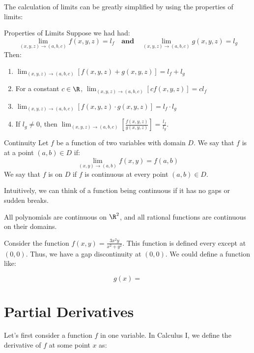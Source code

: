 The calculation of limits can be greatly simplified by using the properties of limits:
\begin{thmbox}{Properties of Limits}{}
    Suppose we had had:
    \[ \lim_{(x,y,z) \to (a,b,c)} f(x,y,z) = l_f \quad \textbf{and} \quad \lim_{(x,y,z) \to (a,b,c)} g(x,y,z) = l_g \]
    Then:
    \begin{enumerate}[noitemsep]
        \item $\lim_{(x,y,z) \to (a,b,c)} \left[ f(x,y,z) + g(x,y,z) \right] = l_f + l_g$
        \item For a constant $c \in \R$, $\lim_{(x,y,z) \to (a,b,c)} \left[ cf(x,y,z) \right] = cl_f$
        \item $\lim_{(x,y,z) \to (a,b,c)} \left[ f(x,y,z) \cdot g(x,y,z) \right] = l_f \cdot l_g$
        \item If $l_g \neq 0$, then $\lim_{(x,y,z) \to (a,b,c)} \left[ \frac{f(x,y,z)}{g(x,y,z)} \right] = \frac{l_f}{l_g}$.
    \end{enumerate}
\end{thmbox}

\begin{dfnbox}{Continuity}{}
    Let $f$ be a function of two variables with domain $D$. We say that $f$ is  at a point $(a,b) \in D$ if:
    \[ \lim_{(x,y) \to (a,b)} f(x,y) = f(a,b) \]
    We say that $f$ is  on $D$ if $f$ is continuous at every point $(a,b) \in D$.
\end{dfnbox}

Intuitively, we can think of a function being continuous if it has no gaps or sudden breaks.

\begin{notebox}
    All polynomials are continuous on $\R^2$, and all rational functions are continuous on their domains.
\end{notebox}

Consider the function $f(x,y) = \frac{3x^2y}{x^2+y^2}$. This function is defined every except at $(0,0)$. Thus, we have a gap discontinuity at $(0,0)$. We could define a function like:

\[ g(x) = \] 

\section{Partial Derivatives}

Let's first consider a function $f$ in one variable. In Calculus I, we define the derivative of $f$ at some point $x$ as:

